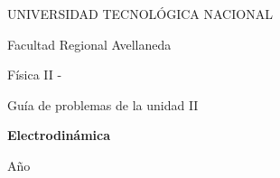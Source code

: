 \begin{titlepage}
    \begin{center}
    \vspace{1.5cm}
    


    \end{center}

    \begin{center}
        {\LARGE UNIVERSIDAD TECNOLÓGICA NACIONAL}\par\medskip
        \vspace*{0.25cm}
        {\LARGE Facultad Regional Avellaneda}\par\medskip
        \vspace*{1cm}
        {\Huge Física II - \comision}\par\medskip
        \vspace*{0.5cm}
        {\LARGE Guía de problemas de la unidad II}\par\bigskip
        \vspace*{1cm}
        {\Huge \bf \color[RGB]{0,121,138} Electrodinámica\par\medskip}
    \end{center}

    \vspace{1cm}

    \begin{center}
        \begin{minipage}[t]{.7\textwidth}
            \renewcommand*{\contentsname}{Contenidos}
            \tableofcontents
        \end{minipage}
        \vspace*{\fill}
    \end{center}
    \begin{center}
        Año \anio
    \end{center}

    \end{titlepage}



